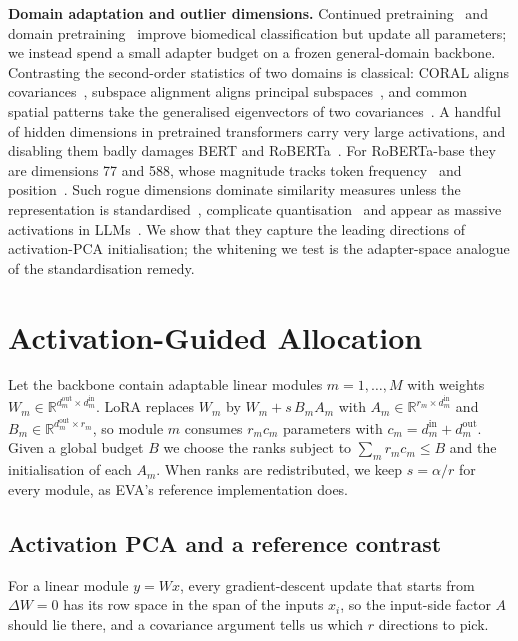 \documentclass[conference]{IEEEtran}
\newcommand{\R}{\mathbb{R}}
\begin{document}
\noindent\textbf{Domain adaptation and outlier dimensions.}
Continued pretraining~\cite{gururangan2020dapt} and domain
pretraining~\cite{gu2021pubmedbert,lee2020biobert,beltagy2019scibert} improve
biomedical classification but update all parameters; we instead spend a small
adapter budget on a frozen general-domain backbone. Contrasting the second-order
statistics of two domains is classical: CORAL aligns
covariances~\cite{sun2016coral}, subspace alignment aligns principal
subspaces~\cite{fernando2013subspace}, and common spatial patterns take the
generalised eigenvectors of two covariances~\cite{koles1990csp,ramoser2000csp}.
A handful of hidden dimensions in pretrained transformers carry very large
activations, and disabling them badly damages BERT and
RoBERTa~\cite{kovaleva2021bertbusters}. For RoBERTa-base they are dimensions 77
and 588, whose magnitude tracks token frequency~\cite{puccetti2022outliers} and
position~\cite{luo2021positional}. Such rogue dimensions dominate similarity
measures unless the representation is standardised~\cite{timkey2021rogue},
complicate quantisation~\cite{bondarenko2021quant,dettmers2022int8} and appear as
massive activations in LLMs~\cite{sun2024massive}. We show that they capture the
leading directions of activation-PCA initialisation; the whitening we test is
the adapter-space analogue of the standardisation remedy.

\section{Activation-Guided Allocation}
\label{sec:method}

Let the backbone contain adaptable linear modules $m = 1,\dots,M$ with weights
$W_m \in \R^{d^{\mathrm{out}}_m \times d^{\mathrm{in}}_m}$. LoRA replaces $W_m$
by $W_m + s\, B_m A_m$ with $A_m \in \R^{r_m \times d^{\mathrm{in}}_m}$ and
$B_m \in \R^{d^{\mathrm{out}}_m \times r_m}$, so module $m$ consumes $r_m c_m$
parameters with $c_m = d^{\mathrm{in}}_m + d^{\mathrm{out}}_m$. Given a global
budget $B$ we choose the ranks subject to $\sum_m r_m c_m \le B$ and the
initialisation of each $A_m$. When ranks are redistributed, we keep
$s = \alpha/r$ for every module, as EVA's reference implementation does.

\subsection{Activation PCA and a reference contrast}

For a linear module $y = Wx$, every gradient-descent update that starts from
$\Delta W = 0$ has its row space in the span of the inputs $x_i$, so the
input-side factor $A$ should lie there, and a covariance argument tells us which
$r$ directions to pick.
\end{document}
